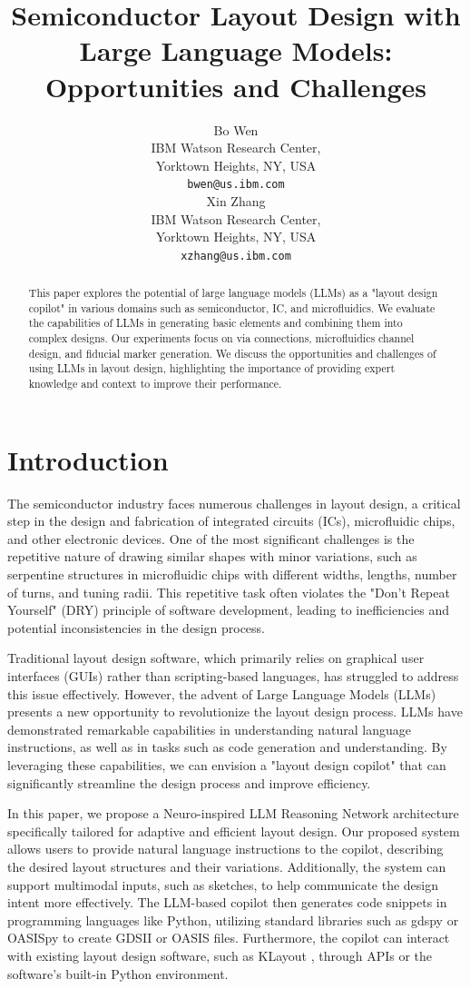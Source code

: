 \documentclass{article}
\title{Semiconductor Layout Design with Large Language Models: Opportunities and Challenges}
\author{%
  Bo Wen\\
  IBM Watson Research Center, \\
  Yorktown Heights, NY, USA \\
  \texttt{bwen@us.ibm.com} \\
  \And
  Xin Zhang\\
  IBM Watson Research Center, \\
  Yorktown Heights, NY, USA \\
  \texttt{xzhang@us.ibm.com} \\
}
\begin{document}
\maketitle

\begin{abstract}
  This paper explores the potential of large language models (LLMs) as a "layout design copilot" in various domains such as semiconductor, IC, and microfluidics. We evaluate the capabilities of LLMs in generating basic elements and combining them into complex designs. Our experiments focus on via connections, microfluidics channel design, and fiducial marker generation. We discuss the opportunities and challenges of using LLMs in layout design, highlighting the importance of providing expert knowledge and context to improve their performance.
\end{abstract}

\section{Introduction}
The semiconductor industry faces numerous challenges in layout design, a critical step in the design and fabrication of integrated circuits (ICs), microfluidic chips, and other electronic devices. One of the most significant challenges is the repetitive nature of drawing similar shapes with minor variations, such as serpentine structures in microfluidic chips with different widths, lengths, number of turns, and tuning radii. \cite{Greengard2024-hx} This repetitive task often violates the "Don't Repeat Yourself" (DRY) principle of software development, leading to inefficiencies and potential inconsistencies in the design process.

Traditional layout design software, which primarily relies on graphical user interfaces (GUIs) rather than scripting-based languages, has struggled to address this issue effectively. However, the advent of Large Language Models (LLMs) presents a new opportunity to revolutionize the layout design process. LLMs have demonstrated remarkable capabilities in understanding natural language instructions, as well as in tasks such as code generation and understanding. By leveraging these capabilities, we can envision a "layout design copilot" that can significantly streamline the design process and improve efficiency.

In this paper, we propose a Neuro-inspired LLM Reasoning Network architecture specifically tailored for adaptive and efficient layout design. Our proposed system allows users to provide natural language instructions to the copilot, describing the desired layout structures and their variations. Additionally, the system can support multimodal inputs, such as sketches, to help communicate the design intent more effectively. The LLM-based copilot then generates code snippets in programming languages like Python, utilizing standard libraries such as gdspy \cite{gdspy} or OASISpy \cite{oasispy} to create GDSII or OASIS files. Furthermore, the copilot can interact with existing layout design software, such as KLayout \cite{klayout}, through APIs or the software's built-in Python environment.
\end{document}

